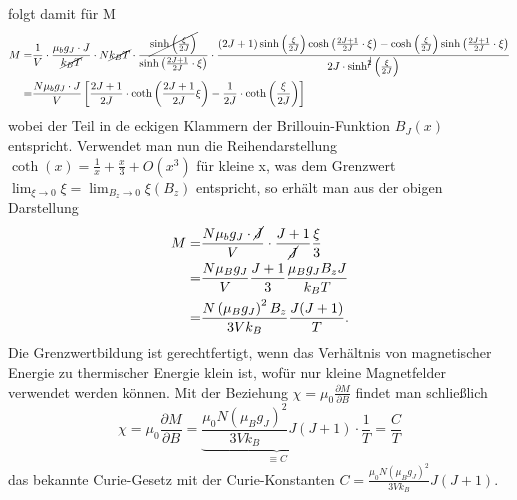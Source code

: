 \documentclass[twoside,colorback,accentcolor=tud4c,11pt]{tudreport}
\begin{document}
folgt damit für M
\begin{align}
M=&\frac{1}{V}\cdot\frac{\mu_{b}g_{J}\cdot J}{\cancel{ k_{B}T}}\cdot N \cancel{k_{B}T}\cdot\frac{\cancel{\sinh\left(\frac{\xi}{2J}\right)}}{\sinh\left(\frac{2J+1}{2J}\cdot\xi\right)}\cdot\frac{(2J+1)\sinh\left(\frac{\xi}{2J}\right)\cosh\left(\frac{2J+1}{2J}\cdot\xi\right)-\cosh\left(\frac{\xi}{2J}\right)\sinh\left(\frac{2J+1}{2J}\cdot\xi\right)}{2J\cdot\sinh^{\cancel{2}}\left(\frac{\xi}{2J}\right)}\\
=&\frac{N\mu_{b}g_{J}\cdot J}{V}\left[\frac{2J+1}{2J}\cdot\coth\left(\frac{2J+1}{2J}\xi\right)-\frac{1}{2J}\cdot\coth\left(\frac{\xi}{2J}\right)\right]
\end{align}
wobei der Teil in de eckigen Klammern der Brillouin-Funktion $B_{J}(x)$ entspricht. Verwendet man nun die Reihendarstellung $\coth (x)=\frac{1}{x}+\frac{x}{3}+O(x^3)$ für kleine x, was dem Grenzwert $\lim_{\xi\to0}\xi=\lim_{B_{z}\to 0}\xi (B_{z})$ entspricht, so erhält man aus der obigen Darstellung
\begin{align}
M=&\frac{N\mu_{b}g_{J}\cdot \cancel{J}}{V}\cdot\frac{J+1}{\cancel{J}}\frac{\xi}{3}\\
=&\frac{N\mu_{B}g_{J}}{V}\frac{J+1}{3}\frac{\mu_{B}g_{J}B_{z}J}{k_{B}T}\\
=&\frac{N\left(\mu_{B}g_{J}\right)^2B_{z}}{3Vk_{B}}\frac{J(J+1)}{T}.
\end{align}
Die Grenzwertbildung ist gerechtfertigt, wenn das Verhältnis von magnetischer Energie zu thermischer Energie klein ist, wofür nur kleine Magnetfelder verwendet werden können. 
Mit der Beziehung $\chi=\mu_{0}\frac{\partial M}{\partial B}$ findet man schließlich
\begin{equation}\label{eq:curie}
\chi=\mu_{0}\frac{\partial M}{\partial B}=\underbrace{\frac{\mu_{0}N\left(\mu_{B}g_{J}\right)^2}{3Vk_{B}}J(J+1)}_{\equiv C}\cdot\frac{1}{T}=\frac{C}{T}
\end{equation}
das bekannte Curie-Gesetz mit der Curie-Konstanten $C=\frac{\mu_{0}N\left(\mu_{B}g_{J}\right)^2}{3Vk_{B}}J(J+1)$.
\end{document}
